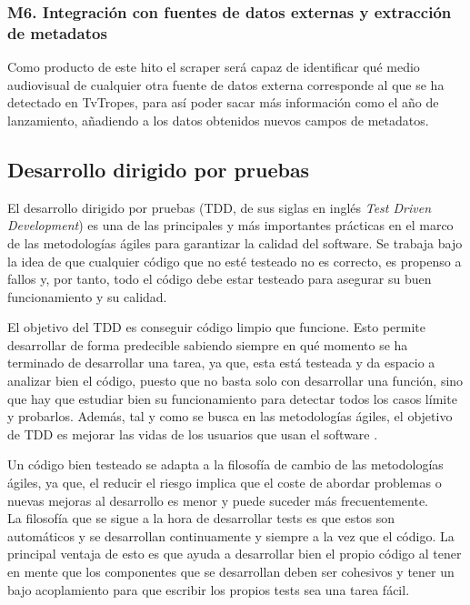 \subsubsection{M6. Integración con fuentes de datos externas y extracción de metadatos}
Como producto de este hito el scraper será capaz de identificar qué medio audiovisual de cualquier otra fuente de datos externa corresponde al que se ha detectado en TvTropes, para así poder sacar más información como el año de lanzamiento, añadiendo a los datos obtenidos nuevos campos de metadatos.

\subsection{Desarrollo dirigido por pruebas}
El desarrollo dirigido por pruebas (TDD, de sus siglas en inglés \textit{Test Driven Development}) es una de las principales y más importantes prácticas en el marco de las metodologías ágiles para garantizar la calidad del software. Se trabaja bajo la idea de que cualquier código que no esté testeado no es correcto, es propenso a fallos y, por tanto, todo el código debe estar testeado para asegurar su buen funcionamiento y su calidad.

El objetivo del TDD es conseguir código limpio que funcione. Esto permite desarrollar de forma predecible sabiendo siempre en qué momento se ha terminado de desarrollar una tarea, ya que, esta está testeada y da espacio a analizar bien el código, puesto que no basta solo con desarrollar una función, sino que hay que estudiar bien su funcionamiento para detectar todos los casos límite y probarlos. Además, tal y como se busca en las metodologías ágiles, el objetivo de TDD es mejorar las vidas de los usuarios que usan el software \cite{beck2002driven}.

Un código bien testeado se adapta a la filosofía de cambio de las metodologías ágiles, ya que, el reducir el riesgo implica que el coste de abordar problemas o nuevas mejoras al desarrollo es menor y puede suceder más frecuentemente.\\

La filosofía que se sigue a la hora de desarrollar tests es que estos son automáticos y se desarrollan continuamente y siempre a la vez que el código. La principal ventaja de esto es que ayuda a desarrollar bien el propio código al tener en mente que los componentes que se desarrollan deben ser cohesivos y tener un bajo acoplamiento para que escribir los propios tests sea una tarea fácil.

